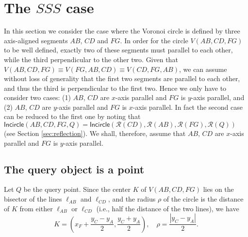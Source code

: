 \documentclass[letterpaper,11pt]{article}
\newcommand{\incircle}{\textsf{Incircle}\xspace}
\newcommand{\vor}{Voronoi\xspace}
\newcommand{\rfx}[1]{\mathcal{R}(#1)\xspace}
\newcommand{\sss}{$SSS$\xspace}
\begin{document}
\section{The \sss case}\label{sec:sss}

In this section we consider the case where the \vor circle is defined
by three axis-aligned segments $AB$, $CD$ and $FG$. In order for the
circle $V(AB,CD,FG)$ to be well defined, exactly two of these segments
must parallel to each other, while the third perpendicular to the
other two.
Given that $V(AB,CD,FG)\equiv{}V(FG,AB,CD)\equiv{}V(CD,FG,AB)$, we
can assume without loss of generality that the first two segments are
parallel to each other, and thus the third is perpendicular to the
first two. Hence we only have to consider two cases:
(1) $AB$, $CD$ are $x$-axis parallel and $FG$ is $y$-axis parallel,
and
(2) $AB$, $CD$ are $y$-axis parallel and $FG$ is $x$-axis parallel.
In fact the second case can be reduced to the first one by noting that
$\incircle(AB,CD,FG,Q)=\incircle(\rfx{CD},\rfx{AB},\rfx{FG},\rfx{Q})$
(see Section \ref{sec:reflection}).
We shall, therefore, assume that $AB$, $CD$ are $x$-axis parallel and 
$FG$ is $y$-axis parallel.

\begin{comment}
\begin{figure}[b]
  \begin{center}
    \texttt{[image: china12]}
  \end{center}
  \caption{The Voronoi circle defined by the axes-aligned segments
    $AB$, $CD$ and $FG$.}
  \label{fig:sss}
\end{figure}  
\end{comment}

\subsection{The query object is a point}\label{sec:sssp}
  
Let $Q$ be the query point. Since the center $K$ of $V(AB,CD,FG)$ lies
on the bisector of the lines $ \ell_{AB}$ and $\ell_{CD}$, and the
radius $\rho$ of the circle is the distance of $K$ from either
$\ell_{AB}$ or $\ell_{CD}$ (i.e., half the distance of the two lines),
we have 
\begin{equation}\label{equ:lll-vc}
  K= (x_F+\dfrac{y_C-y_A}{2}, \dfrac{y_C+y_A}{2}), \quad \rho =
  \dfrac{|y_C-y_A|}{2}.
\end{equation}
\end{document}
